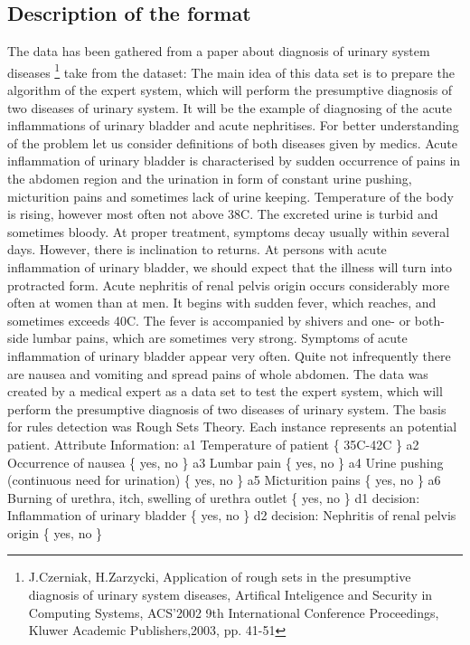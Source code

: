 \documentclass[a4paper,twoside,11pt]{article}
\begin{document}
\subsection{Description of the format}
The data has been gathered from a paper about diagnosis of urinary system diseases \footnote{J.Czerniak, H.Zarzycki, Application of rough sets in the presumptive diagnosis of urinary system diseases, Artifical Inteligence and Security in Computing Systems, ACS'2002 9th International Conference Proceedings, Kluwer Academic Publishers,2003, pp. 41-51} \newline
take from the dataset: \newline
The main idea of this data set is to prepare the algorithm of the expert system, which will perform the presumptive diagnosis of two diseases of urinary system. It will be the example of diagnosing of the acute inflammations of urinary bladder and acute nephritises. For better understanding of the problem let us consider definitions of both diseases given by medics. Acute inflammation of urinary bladder is characterised by sudden occurrence of pains in the abdomen region and the urination in form of constant urine pushing, micturition pains and sometimes lack of urine keeping. Temperature of the body is rising, however most often not above 38C. The excreted urine is turbid and sometimes bloody. At proper treatment, symptoms decay usually within
several days. However, there is inclination to returns. At persons with acute inflammation of urinary bladder, we should expect that the illness will turn into protracted form. \newline
Acute nephritis of renal pelvis origin occurs considerably more often at women than at men. It begins with sudden fever, which reaches, and sometimes exceeds 40C. The fever is accompanied by shivers and one- or both-side lumbar pains, which are sometimes very strong. Symptoms of acute inflammation of urinary bladder appear very often. Quite not infrequently there are nausea and vomiting and spread pains of whole abdomen. \newline
The data was created by a medical expert as a data set to test the expert system, which will perform the presumptive diagnosis of two diseases of urinary system. The basis for rules detection was Rough Sets Theory. Each instance represents an potential patient. \newline
Attribute Information: \newline
a1 Temperature of patient \{ 35C-42C \} \newline
a2 Occurrence of nausea \{ yes, no \} \newline
a3 Lumbar pain \{ yes, no \} \newline
a4 Urine pushing (continuous need for urination) \{ yes, no \} \newline
a5 Micturition pains \{ yes, no \} \newline
a6 Burning of urethra, itch, swelling of urethra outlet \{ yes, no \} \newline
d1 decision: Inflammation of urinary bladder \{ yes, no \} \newline
d2 decision: Nephritis of renal pelvis origin \{ yes, no \} \newline
\end{document}
